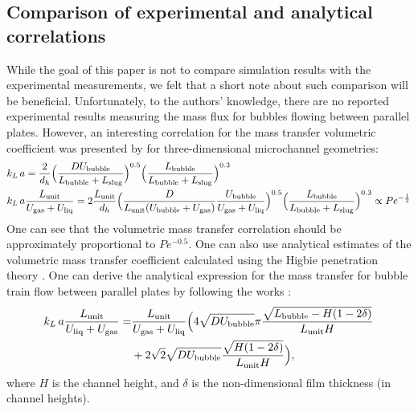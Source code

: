 \documentclass[review,12pt]{elsarticle}
\newcommand{\beq}{\begin{equation}}
\newcommand{\feq}{\end{equation}}
\newcommand{\beqal}{\begin{equation}\begin{aligned}}
\newcommand{\feqal}{\end{aligned}\end{equation}}
\newcommand{\vol}{k_L\,a}
\newcommand{\lbubble}{L_{\mathrm{bubble}}}
\newcommand{\lunit}{L_{\mathrm{unit}}}
\newcommand{\lslug}{L_{\mathrm{slug}}}
\newcommand{\ububble}{U_{\mathrm{bubble}}}
\newcommand{\uliq}{U_{\mathrm{liq}}}
\newcommand{\ugas}{U_{\mathrm{gas}}}
\newcommand{\volnondim}{\vol \frac{\lunit}{\uliq+\ugas}}
\begin{document}
\subsection{Comparison of experimental and analytical correlations}
While the goal of this paper is not to compare simulation results with the experimental measurements, 
we felt that a short note about such comparison will be beneficial.
Unfortunately, to the authors' knowledge, there are no reported experimental results measuring the mass flux for
  bubbles flowing between parallel plates. However, an interesting
correlation for the mass transfer volumetric coefficient was presented by
\citet{yue-mass} for three-dimensional microchannel geometries:
\beqal
&\vol=\frac{2}{d_h}\Bigl(\frac{D \ububble}{\lbubble+\lslug}\Bigr)^{0.5}
\Bigl(\frac{\lbubble}{\lbubble+\lslug}\Bigr)^{0.3}\\
&\vol \frac{\lunit}{\ugas+\uliq}=2\frac{\lunit}{d_h} \Bigl(\frac{D 
}{\lunit (\ububble+\ugas)} \frac{\ububble}{\ugas+\uliq}\Bigr)^{0.5}
\Bigl(\frac{\lbubble}{\lbubble+\lslug}\Bigr)^{0.3} \propto Pe^{-\frac{1}{2}}\\
\feqal
One can see that  the volumetric mass transfer correlation should be approximately proportional to
$Pe^{-0.5}$.  One can also use analytical estimates of the volumetric mass transfer
coefficient calculated using the Higbie penetration theory \cite{higbie}. One can derive the analytical expression for the mass transfer for bubble train flow between parallel plates by following the works
\cite{irandoust,vanbaten-circular}:
\beq
\label{vanbaten:analytical:expresssion}
\begin{aligned}
\volnondim=&\frac{\lunit}{\ugas+\uliq}\Bigl(4 \sqrt{D \ububble}{\pi}
\frac{\sqrt{\lbubble-H (1-2\delta)}}{\lunit H}\\
&+2 \sqrt{2} \sqrt{D \ububble} \frac{\sqrt{H
(1-2\delta)}}{\lunit H}\Bigr),
\end{aligned}
\feq
where $H$ is the channel height, and $\delta$ is the non-dimensional film thickness (in channel heights).
\end{document}
